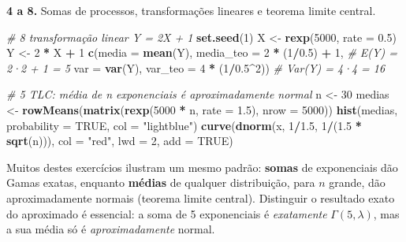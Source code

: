 \documentclass[
  portuguese,
  11pt,
  openany]{book}
\newenvironment{Shaded}{\begin{snugshade}}{\end{snugshade}}
\newcommand{\AttributeTok}[1]{\textcolor[rgb]{0.13,0.29,0.53}{#1}}
\newcommand{\CommentTok}[1]{\textcolor[rgb]{0.56,0.35,0.01}{\textit{#1}}}
\newcommand{\ConstantTok}[1]{\textcolor[rgb]{0.56,0.35,0.01}{#1}}
\newcommand{\DecValTok}[1]{\textcolor[rgb]{0.00,0.00,0.81}{#1}}
\newcommand{\FloatTok}[1]{\textcolor[rgb]{0.00,0.00,0.81}{#1}}
\newcommand{\FunctionTok}[1]{\textcolor[rgb]{0.13,0.29,0.53}{\textbf{#1}}}
\newcommand{\NormalTok}[1]{#1}
\newcommand{\OtherTok}[1]{\textcolor[rgb]{0.56,0.35,0.01}{#1}}
\newcommand{\SpecialCharTok}[1]{\textcolor[rgb]{0.81,0.36,0.00}{\textbf{#1}}}
\newcommand{\StringTok}[1]{\textcolor[rgb]{0.31,0.60,0.02}{#1}}
\begin{document}
\textbf{4 a 8.} Somas de processos, transformações lineares e teorema limite central.

\begin{Shaded}
\begin{Highlighting}[]
\CommentTok{\# 8 transformação linear Y = 2X + 1}
\FunctionTok{set.seed}\NormalTok{(}\DecValTok{1}\NormalTok{)}
\NormalTok{X }\OtherTok{\textless{}{-}} \FunctionTok{rexp}\NormalTok{(}\DecValTok{5000}\NormalTok{, }\AttributeTok{rate =} \FloatTok{0.5}\NormalTok{)}
\NormalTok{Y }\OtherTok{\textless{}{-}} \DecValTok{2} \SpecialCharTok{*}\NormalTok{ X }\SpecialCharTok{+} \DecValTok{1}
\FunctionTok{c}\NormalTok{(}\AttributeTok{media =} \FunctionTok{mean}\NormalTok{(Y), }\AttributeTok{media\_teo =} \DecValTok{2} \SpecialCharTok{*}\NormalTok{ (}\DecValTok{1}\SpecialCharTok{/}\FloatTok{0.5}\NormalTok{) }\SpecialCharTok{+} \DecValTok{1}\NormalTok{,   }\CommentTok{\# E(Y) = 2·2 + 1 = 5}
  \AttributeTok{var =} \FunctionTok{var}\NormalTok{(Y),   }\AttributeTok{var\_teo =} \DecValTok{4} \SpecialCharTok{*}\NormalTok{ (}\DecValTok{1}\SpecialCharTok{/}\FloatTok{0.5}\SpecialCharTok{\^{}}\DecValTok{2}\NormalTok{))         }\CommentTok{\# Var(Y) = 4·4 = 16}

\CommentTok{\# 5 TLC: média de n exponenciais é aproximadamente normal}
\NormalTok{n }\OtherTok{\textless{}{-}} \DecValTok{30}
\NormalTok{medias }\OtherTok{\textless{}{-}} \FunctionTok{rowMeans}\NormalTok{(}\FunctionTok{matrix}\NormalTok{(}\FunctionTok{rexp}\NormalTok{(}\DecValTok{5000} \SpecialCharTok{*}\NormalTok{ n, }\AttributeTok{rate =} \FloatTok{1.5}\NormalTok{), }\AttributeTok{nrow =} \DecValTok{5000}\NormalTok{))}
\FunctionTok{hist}\NormalTok{(medias, }\AttributeTok{probability =} \ConstantTok{TRUE}\NormalTok{, }\AttributeTok{col =} \StringTok{"lightblue"}\NormalTok{)}
\FunctionTok{curve}\NormalTok{(}\FunctionTok{dnorm}\NormalTok{(x, }\DecValTok{1}\SpecialCharTok{/}\FloatTok{1.5}\NormalTok{, }\DecValTok{1}\SpecialCharTok{/}\NormalTok{(}\FloatTok{1.5} \SpecialCharTok{*} \FunctionTok{sqrt}\NormalTok{(n))), }\AttributeTok{col =} \StringTok{"red"}\NormalTok{, }\AttributeTok{lwd =} \DecValTok{2}\NormalTok{, }\AttributeTok{add =} \ConstantTok{TRUE}\NormalTok{)}
\end{Highlighting}
\end{Shaded}

Muitos destes exercícios ilustram um mesmo padrão: \textbf{somas} de exponenciais dão
Gamas exatas, enquanto \textbf{médias} de qualquer distribuição, para \(n\) grande, dão
aproximadamente normais (teorema limite central). Distinguir o resultado exato
do aproximado é essencial: a soma de 5 exponenciais é \emph{exatamente} \(\Gamma(5,
\lambda)\), mas a sua média só é \emph{aproximadamente} normal.
\end{document}
